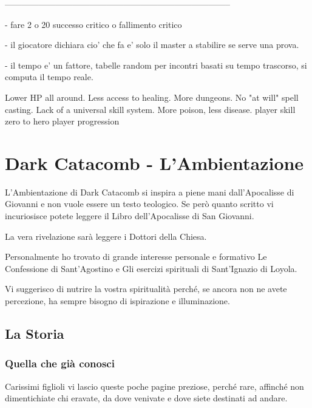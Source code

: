 \documentclass[12pt,a4paper,twoside,openany]{book}
\begin{document}
--------------------------------------------------------------------------------



- fare 2 o 20  successo critico o fallimento  critico

- il giocatore dichiara cio' che fa e' solo il master a stabilire se serve una prova. 

- il tempo e' un fattore, tabelle random per incontri basati su tempo trascorso, si computa il tempo reale.

Lower HP all around.
Less access to healing.
More dungeons.
No "at will" spell casting.
Lack of a universal skill system.
More poison, less disease.
player skill
zero to hero player progression


\section{Dark Catacomb - L'Ambientazione}



\begin{narratore}
L'Ambientazione di Dark Catacomb si inspira a piene mani dall'Apocalisse di Giovanni e non vuole essere un testo teologico. Se però quanto scritto vi incuriosisce potete leggere il Libro dell'Apocalisse di San Giovanni.

La  vera rivelazione sarà leggere i Dottori della Chiesa.

Personalmente ho trovato di grande interesse personale e formativo Le Confessione di Sant'Agostino e Gli esercizi spirituali di Sant'Ignazio di Loyola.

Vi suggerisco di nutrire la vostra spiritualità perché, se ancora non ne avete percezione, ha sempre bisogno di ispirazione e illuminazione.

\end{narratore}	

\subsection{La Storia}

\subsubsection{Quella che già conosci}


Carissimi figlioli vi lascio queste poche pagine preziose, perché rare, affinché non dimentichiate chi eravate, da dove venivate e dove siete destinati ad andare.
\end{document}
